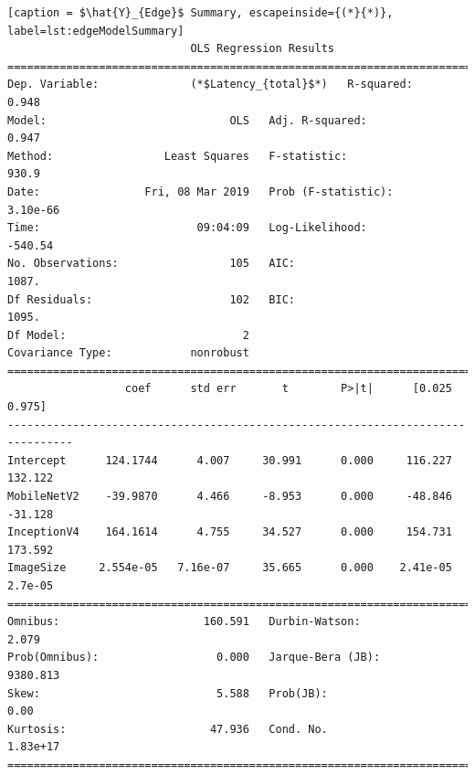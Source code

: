 \lstset{basicstyle=\scriptsize}
\begin{minipage}{\linewidth}
\begin{lstlisting}[caption = $\hat{Y}_{Edge}$ Summary, escapeinside={(*}{*)}, label=lst:edgeModelSummary]
                            OLS Regression Results                            
==============================================================================
Dep. Variable:              (*$Latency_{total}$*)   R-squared:                       0.948
Model:                            OLS   Adj. R-squared:                  0.947
Method:                 Least Squares   F-statistic:                     930.9
Date:                Fri, 08 Mar 2019   Prob (F-statistic):           3.10e-66
Time:                        09:04:09   Log-Likelihood:                -540.54
No. Observations:                 105   AIC:                             1087.
Df Residuals:                     102   BIC:                             1095.
Df Model:                           2                                         
Covariance Type:            nonrobust                                         
================================================================================
                  coef      std err       t        P>|t|      [0.025      0.975]
--------------------------------------------------------------------------------
Intercept      124.1744      4.007     30.991      0.000     116.227     132.122
MobileNetV2    -39.9870      4.466     -8.953      0.000     -48.846     -31.128
InceptionV4    164.1614      4.755     34.527      0.000     154.731     173.592
ImageSize     2.554e-05   7.16e-07     35.665      0.000    2.41e-05     2.7e-05
==============================================================================
Omnibus:                      160.591   Durbin-Watson:                   2.079
Prob(Omnibus):                  0.000   Jarque-Bera (JB):             9380.813
Skew:                           5.588   Prob(JB):                         0.00
Kurtosis:                      47.936   Cond. No.                     1.83e+17
==============================================================================
\end{lstlisting}


\end{minipage}
